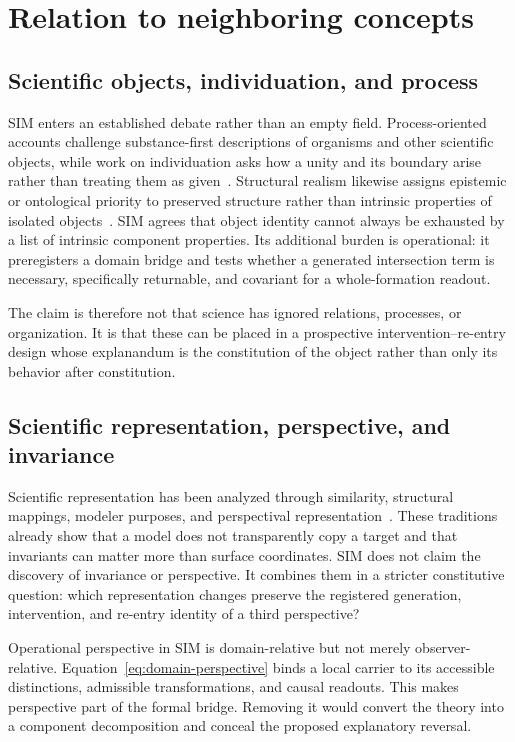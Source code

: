 \documentclass[11pt,a4paper]{article}
\begin{document}
\section{Relation to neighboring concepts}

\subsection{Scientific objects, individuation, and process}

SIM enters an established debate rather than an empty field. Process-oriented accounts challenge substance-first descriptions of organisms and other scientific objects, while work on individuation asks how a unity and its boundary arise rather than treating them as given~\cite{simondon1992,dupre2012,nicholson2018}. Structural realism likewise assigns epistemic or ontological priority to preserved structure rather than intrinsic properties of isolated objects~\cite{worrall1989,ladyman1998}. SIM agrees that object identity cannot always be exhausted by a list of intrinsic component properties. Its additional burden is operational: it preregisters a domain bridge and tests whether a generated intersection term is necessary, specifically returnable, and covariant for a whole-formation readout.

The claim is therefore not that science has ignored relations, processes, or organization. It is that these can be placed in a prospective intervention--re-entry design whose explanandum is the constitution of the object rather than only its behavior after constitution.

\subsection{Scientific representation, perspective, and invariance}

Scientific representation has been analyzed through similarity, structural mappings, modeler purposes, and perspectival representation~\cite{giere2006,vanfraassen2008,friggnguyen2020}. These traditions already show that a model does not transparently copy a target and that invariants can matter more than surface coordinates. SIM does not claim the discovery of invariance or perspective. It combines them in a stricter constitutive question: which representation changes preserve the registered generation, intervention, and re-entry identity of a third perspective?

Operational perspective in SIM is domain-relative but not merely observer-relative. Equation~\eqref{eq:domain-perspective} binds a local carrier to its accessible distinctions, admissible transformations, and causal readouts. This makes perspective part of the formal bridge. Removing it would convert the theory into a component decomposition and conceal the proposed explanatory reversal.
\end{document}
